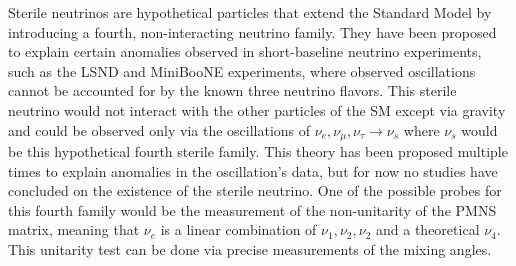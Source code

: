 \documentclass[../main.tex]{subfiles}
\begin{document}
Sterile neutrinos are hypothetical particles that extend the Standard Model by introducing a fourth, non-interacting neutrino family. They have been proposed to explain certain anomalies observed in short-baseline neutrino experiments, such as the LSND \cite{lsnd_collaboration_evidence_2001} and MiniBooNE \cite{miniboone_collaboration_significant_2018} experiments, where observed oscillations cannot be accounted for by the known three neutrino flavors.
This sterile neutrino would not interact with the other particles of the SM except via gravity and could be observed only via the oscillations of $\nu_e,\nu_\mu,\nu_\tau \rightarrow \nu_s$ where $\nu_s$ would be this hypothetical fourth sterile family. This theory has been proposed multiple times to explain anomalies in the oscillation's data, but for now no studies have concluded on the existence of the sterile neutrino. One of the possible probes for this fourth family would be the measurement of the non-unitarity of the PMNS matrix, meaning that $\nu_e$ is a linear combination of $\nu_1, \nu_2, \nu_2$ and a theoretical $\nu_4$. This unitarity test can be done via precise measurements of the mixing angles.
\end{document}
